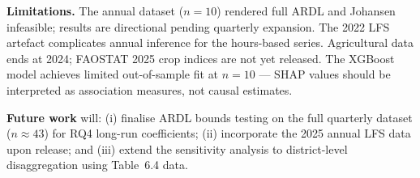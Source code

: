 \documentclass[sigconf]{acmart}
\begin{document}
\textbf{Limitations.} The annual dataset ($n{=}10$) rendered full ARDL and
Johansen infeasible; results are directional pending quarterly expansion.
The 2022 LFS artefact complicates annual inference for the hours-based
series. Agricultural data ends at 2024; FAOSTAT 2025 crop indices are
not yet released. The XGBoost model achieves limited out-of-sample fit at
$n{=}10$ --- SHAP values should be interpreted as association measures,
not causal estimates.

\textbf{Future work} will: (i) finalise ARDL bounds testing on the full
quarterly dataset ($n{\approx}43$) for RQ4 long-run coefficients;
(ii) incorporate the 2025 annual LFS data upon release; and (iii) extend
the sensitivity analysis to district-level disaggregation using
Table~6.4 data.



\end{document}
